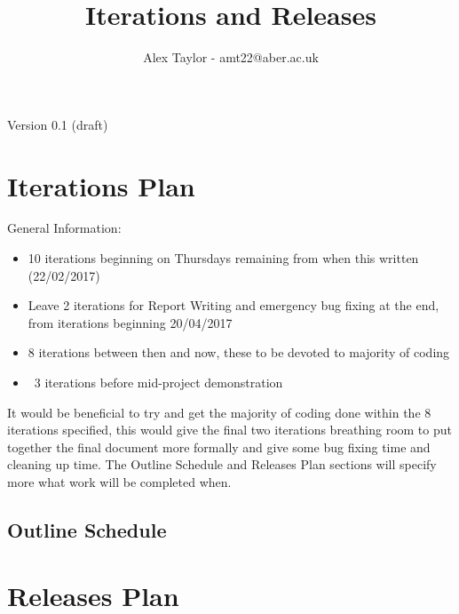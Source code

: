 \documentclass{article}
\title{Iterations and Releases}
\author{Alex Taylor - amt22@aber.ac.uk}
\begin{document}
\maketitle
\begin{center}
	Version 0.1 (draft)
\end{center}
\tableofcontents
\thispagestyle{empty}
\newpage

\section{Iterations Plan}
General Information:
\begin{itemize}
	\item 10 iterations beginning on Thursdays remaining from when this written (22/02/2017)
	\item Leave 2 iterations for Report Writing and emergency bug fixing at the end, from iterations beginning 20/04/2017
	\item 8 iterations between then and now, these to be devoted to majority of coding
	\item ~3 iterations before mid-project demonstration
\end{itemize}
It would be beneficial to try and get the majority of coding done within the 8 iterations specified, this would give the final two iterations breathing room to put together the final document more formally and give some bug fixing time and cleaning up time. The Outline Schedule and Releases Plan sections will specify more what work will be completed when.
\subsection{Outline Schedule}
\newpage
\section{Releases Plan}
\end{document}

